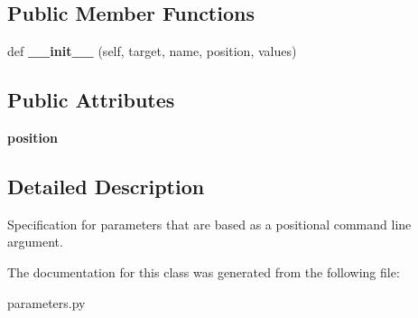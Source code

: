 \subsection*{Public Member Functions}
\begin{DoxyCompactItemize}
\item 
\mbox{\label{classcodar_1_1cheetah_1_1parameters_1_1_param_cmd_line_arg_af01175865438c0b3a065aae0790786f1}} 
def {\bfseries \+\_\+\+\_\+init\+\_\+\+\_\+} (self, target, name, position, values)
\end{DoxyCompactItemize}
\subsection*{Public Attributes}
\begin{DoxyCompactItemize}
\item 
\mbox{\label{classcodar_1_1cheetah_1_1parameters_1_1_param_cmd_line_arg_a3fc6c85c37895ee7d710475090562ab8}} 
{\bfseries position}
\end{DoxyCompactItemize}


\subsection{Detailed Description}
\begin{DoxyVerb}Specification for parameters that are based as a positional command line
argument.\end{DoxyVerb}
 

The documentation for this class was generated from the following file\+:\begin{DoxyCompactItemize}
\item 
parameters.\+py\end{DoxyCompactItemize}
